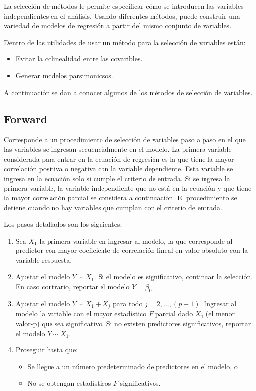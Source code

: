 \documentclass[
  11pt,
]{book}
\providecommand{\tightlist}{%
  \setlength{\itemsep}{0pt}\setlength{\parskip}{0pt}}
\theoremstyle{definition}
\theoremstyle{definition}
\theoremstyle{definition}
\theoremstyle{definition}
\theoremstyle{remark}
\begin{document}
La selección de métodos le permite especificar cómo se introducen las variables independientes en el análisis. Usando diferentes métodos, puede construir una variedad de modelos de regresión a partir del mismo conjunto de variables.

Dentro de las utilidades de usar un método para la selección de variables están:

\begin{itemize}
\tightlist
\item
  Evitar la colinealidad entre las covaribles.
\item
  Generar modelos parsimoniosos.
\end{itemize}

A continuación se dan a conocer algunos de los métodos de selección de variables.

\subsection{Forward}\label{regresion-lineal-seleccion-variables-forward}

Corresponde a un procedimiento de selección de variables paso a paso en el que las variables se ingresan secuencialmente en el modelo. La primera variable considerada para entrar en la ecuación de regresión es la que tiene la mayor correlación positiva o negativa con la variable dependiente. Esta variable se ingresa en la ecuación solo si cumple el criterio de entrada. Si se ingresa la primera variable, la variable independiente que no está en la ecuación y que tiene la mayor correlación parcial se considera a continuación. El procedimiento se detiene cuando no hay variables que cumplan con el criterio de entrada.

Los pasos detallados son los siguientes:

\begin{enumerate}
\def\labelenumi{\arabic{enumi}.}
\tightlist
\item
  Sea \(X_1\) la primera variable en ingresar al modelo, la que corresponde al predictor con mayor coeficiente de correlación lineal en valor absoluto con la variable respuesta.
\item
  Ajustar el modelo \(Y \sim X_1\). Si el modelo es significativo, continuar la selección. En caso contrario, reportar el modelo \(Y = \beta_0\).
\item
  Ajustar el modelo \(Y \sim X_1 + X_j\) para todo \(j = 2, \ldots , (p -1)\). Ingresar al modelo la variable con el mayor estadístico \(F\) parcial dado \(X_1\) (el menor valor-p) que sea significativo. Si no existen predictores significativos, reportar el modelo \(Y \sim X_1\).
\item
  Proseguir hasta que:

  \begin{itemize}
  \tightlist
  \item
    Se llegue a un número predeterminado de predictores en el modelo, o
  \item
    No se obtengan estadísticos \(F\) significativos.
  \end{itemize}
\end{enumerate}
\end{document}
